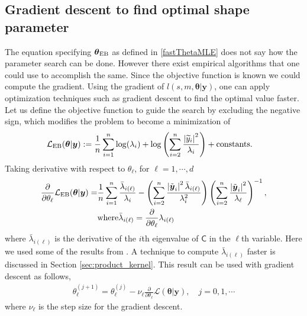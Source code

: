 \documentclass{svjour3}                     %
\newcommand{\bm}[1]{\boldsymbol{#1}}
\newcommand{\vtheta}{{\bm{\theta}}}
\newcommand{\vy}{\bm{y}}
\newcommand{\tvy}{\tilde{\bm{y}}}
\newcommand{\vone}{\bm{1}}
\newcommand{\mC}{\mathsf{C}}
\newcommand{\mCInv}{\mathsf{C}^{-1}}
\newcommand{\MLE}{\textup{EB}}
\def\abs#1{\ensuremath{\left \lvert #1 \right \rvert}}
\begin{document}
\subsection{Gradient descent to find optimal shape parameter}
\label{grad_descent_MLE}
The equation specifying $\vtheta_\MLE$ as defined in \eqref{fastThetaMLE} does not say how the parameter search can be done. However there exist empirical algorithms \cite{Bre73, For77} that one could use to accomplish the same.
Since the objective function is known we could compute the gradient.
Using the gradient of $l(s,m,\vtheta | \vy)$, one can apply optimization techniques such as gradient descent to find the optimal value faster. Let us define the objective function to guide the search by excluding the negative sign, which modifies the problem to become a minimization of
\begin{align*}
\mathcal{L}_{\MLE}(\vtheta | \vy)
&:= %
\frac{1}{n}\sum_{i=1}^n \log(\lambda_{i}) + 
\log\left(
\sum_{i=2}^n \frac{\abs{\widetilde{y}_i}^2}{\lambda_{i}}
\right) + \text{constants.}
\end{align*}
Taking derivative with respect to $\theta_\ell$, for $\ell=1,\cdots,d$
\begin{align}
\label{eqn:deriv_obj_func_MLE}
\frac{\partial}{\partial \theta_\ell} \mathcal{L}_{\MLE}(\vtheta | \vy)
= & \frac 1n \sum_{i=1}^{n} \frac{\bar{\lambda}_{i(\ell)}}{\lambda_i}
- \left({ \sum_{i=2}^n \frac{\abs{\tvy_i}^2 \bar{\lambda}_{i(\ell)}}{\lambda_i^2}}\right)
\left( {\sum_{i=2}^n \frac{\abs{\tvy_i}^2}{\lambda_\ell}} \right)^{-1}, \\
& \text{where} \bar{\lambda}_{i(\ell)} = \frac{\partial}{\partial \theta_\ell} {\lambda}_{i(\ell)}
\end{align}
where $\bar{\lambda}_{i(\ell)}$ is the derivative of the $i$th eigenvalue of $\mC$ in the $\ell$th variable. 
Here we used some of the results from \cite{Dong2017a}. A technique to compute $\bar{\lambda}_{i(\ell)}$ faster is discussed in Section \ref{sec:product_kernel}.
This result can be used with gradient descent as follows,
\begin{align}
\label{eqn:deep_descent}
\theta_\ell^{(j+1)} = \theta_\ell^{(j)} - \nu_\ell \frac{\partial}{\partial \theta_\ell} \mathcal{L}(\vtheta | \vy), \quad j=0,1,\cdots
\end{align}
where $\nu_\ell$ is the step size for the gradient descent. 
\end{document}
